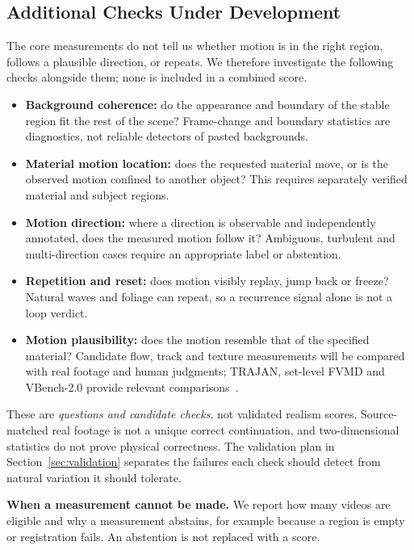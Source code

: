 \subsection{Additional Checks Under Development}
The core measurements do not tell us whether motion is in the right region, follows a plausible direction, or repeats. We therefore investigate the following checks alongside them; none is included in a combined score.
\begin{itemize}
\item \textbf{Background coherence:} do the appearance and boundary of the stable region fit the rest of the scene? Frame-change and boundary statistics are diagnostics, not reliable detectors of pasted backgrounds.
\item \textbf{Material motion location:} does the requested material move, or is the observed motion confined to another object? This requires separately verified material and subject regions.
\item \textbf{Motion direction:} where a direction is observable and independently annotated, does the measured motion follow it? Ambiguous, turbulent and multi-direction cases require an appropriate label or abstention.
\item \textbf{Repetition and reset:} does motion visibly replay, jump back or freeze? Natural waves and foliage can repeat, so a recurrence signal alone is not a loop verdict.
\item \textbf{Motion plausibility:} does the motion resemble that of the specified material? Candidate flow, track and texture measurements will be compared with real footage and human judgments; TRAJAN, set-level FVMD and VBench-2.0 provide relevant comparisons~\cite{allen2025trajan,liu2024fvmd,Zheng2025VBench20AV}.
\end{itemize}
These are \emph{questions and candidate checks}, not validated realism scores. Source-matched real footage is not a unique correct continuation, and two-dimensional statistics do not prove physical correctness. The validation plan in Section~\ref{sec:validation} separates the failures each check should detect from natural variation it should tolerate.

\textbf{When a measurement cannot be made.} We report how many videos are eligible and why a measurement abstains, for example because a region is empty or registration fails. An abstention is not replaced with a score.
